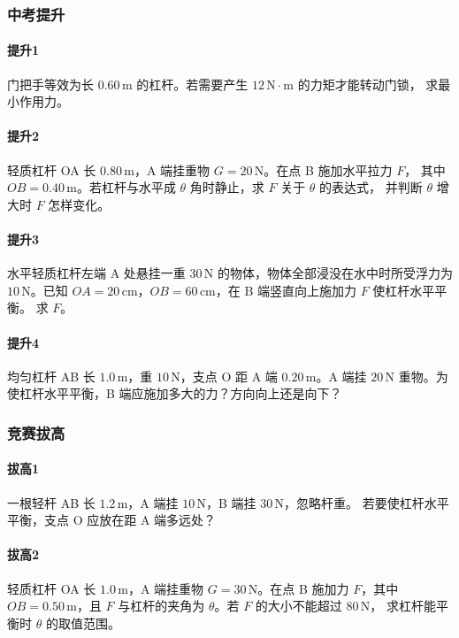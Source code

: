 \documentclass[12pt,a4paper]{ctexart}
\begin{document}
\subsubsection*{中考提升}
\paragraph{提升1}
门把手等效为长 $0.60\,\mathrm{m}$ 的杠杆。若需要产生 $12\,\mathrm{N\cdot m}$ 的力矩才能转动门锁，
求最小作用力。

\paragraph{提升2}
轻质杠杆 OA 长 $0.80\,\mathrm{m}$，A 端挂重物 $G=20\,\mathrm{N}$。在点 B 施加水平拉力 $F$，
其中 $OB=0.40\,\mathrm{m}$。若杠杆与水平成 $\theta$ 角时静止，求 $F$ 关于 $\theta$ 的表达式，
并判断 $\theta$ 增大时 $F$ 怎样变化。

\paragraph{提升3}
水平轻质杠杆左端 A 处悬挂一重 $30\,\mathrm{N}$ 的物体，物体全部浸没在水中时所受浮力为
$10\,\mathrm{N}$。已知 $OA=20\,\mathrm{cm}$，$OB=60\,\mathrm{cm}$，在 B 端竖直向上施加力 $F$ 使杠杆水平平衡。
求 $F$。

\paragraph{提升4}
均匀杠杆 AB 长 $1.0\,\mathrm{m}$，重 $10\,\mathrm{N}$，支点 O 距 A 端 $0.20\,\mathrm{m}$。A 端挂
$20\,\mathrm{N}$ 重物。为使杠杆水平平衡，B 端应施加多大的力？方向向上还是向下？

\subsubsection*{竞赛拔高}
\paragraph{拔高1}
一根轻杆 AB 长 $1.2\,\mathrm{m}$，A 端挂 $10\,\mathrm{N}$，B 端挂 $30\,\mathrm{N}$，忽略杆重。
若要使杠杆水平平衡，支点 O 应放在距 A 端多远处？

\paragraph{拔高2}
轻质杠杆 OA 长 $1.0\,\mathrm{m}$，A 端挂重物 $G=30\,\mathrm{N}$。在点 B 施加力 $F$，其中
$OB=0.50\,\mathrm{m}$，且 $F$ 与杠杆的夹角为 $\theta$。若 $F$ 的大小不能超过 $80\,\mathrm{N}$，
求杠杆能平衡时 $\theta$ 的取值范围。
\end{document}
